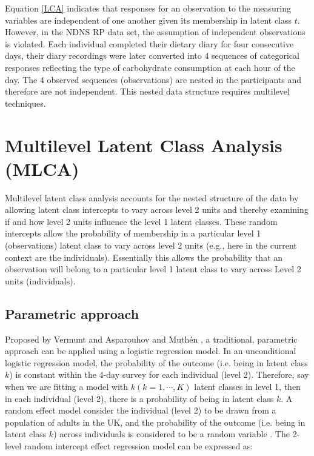 Equation \ref{LCA} indicates that responses for an observation to the measuring variables are independent of one another given its membership in latent class $t$. However, in the NDNS RP data set, the assumption of independent observations is violated. Each individual completed their dietary diary for four consecutive days, their diary recordings were later converted into 4 sequences of categorical responses reflecting the type of carbohydrate consumption at each hour of the day. The 4 observed sequences (observations) are nested in the participants and therefore are not independent. This nested data structure requires multilevel techniques. 
\vspace{-0.3cm}


\section{Multilevel Latent Class Analysis (MLCA)}\vspace{-0.3cm}


Multilevel latent class analysis accounts for the nested structure of the data by allowing latent class intercepts to vary across level 2 units and thereby examining if and how level 2 units influence the level 1 latent classes. These random intercepts allow the probability of
membership in a particular level 1 (observations) latent class to vary across level 2 units (e.g., here in the current context are the individuals). Essentially this allows the probability that an observation will belong to a
particular level 1 latent class to vary across Level 2 units (individuals). \vspace{-0.5cm}

\subsection{Parametric approach}\vspace{-0.3cm}

Proposed by Vermunt \parencite{Vermunt, vermunt2008latent} and Asparouhov and Muth\'en \parencite{muthen2009multilevel},  a traditional, parametric approach can be applied using a logistic regression model. In an unconditional logistic regression model, the probability of the outcome (i.e. being in latent class $k$) is constant within the 4-day survey for each individual (level 2). Therefore, say when we are fitting a model with $k (k = 1, \cdots, K)$ latent classes in level 1, then in each individual (level 2), there is a probability of being in latent class $k$. A random effect model consider the individual (level 2) to be drawn from a population of adults in the UK, and the probability of the outcome (i.e. being in latent class $k$) across individuals is considered to be a random variable \parencite{snijders2011multilevel}. The 2-level random intercept effect regression model can be expressed as:\vspace{-0.4cm}


